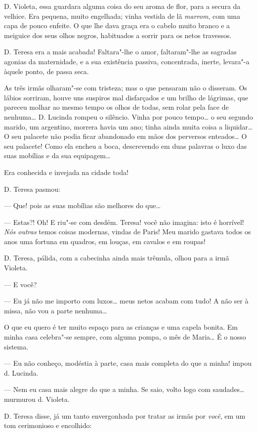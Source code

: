 D. Violeta, essa guardara alguma coisa do seu aroma de flor, para a
secura da velhice. Era pequena, muito engelhada; vinha vestida de lã
\emph{marrom}, com uma capa de pouco enfeite. O que lhe dava graça era o
cabelo muito branco e a meiguice dos seus olhos negros, habituados a
sorrir para os netos travessos.

D. Teresa era a mais acabada! Faltara"-lhe o amor, faltaram"-lhe as
sagradas agonias da maternidade, e a sua existência passiva,
concentrada, inerte, levara"-a àquele ponto, de passa seca.

As três irmãs olharam"-se com tristeza; mas o que pensaram não o
disseram. Os lábios sorriram, houve uns suspiros mal disfarçados e um
brilho de lágrimas, que pareceu molhar ao mesmo tempo os olhos de todas,
sem rolar pela face de nenhuma\ldots{} D. Lucinda rompeu o silêncio. Vinha
por pouco tempo\ldots{} o seu segundo marido, um argentino, morrera havia um
ano; tinha ainda muita coisa a liquidar\ldots{} O seu palacete não podia
ficar abandonado em mãos dos perversos enteados\ldots{} O seu palacete! Como
ela encheu a boca, descrevendo em duas palavras o luxo das suas mobílias
e da sua equipagem\ldots{}

Era conhecida e invejada na cidade toda!

D. Teresa pasmou:

--- Que! pois as suas mobílias são melhores do que\ldots{}

--- Estas?! Oh! E riu"-se com desdém. Teresa! você não imagina: isto é
horrível! \emph{Nós outras} temos coisas modernas, vindas de Paris! Meu
marido gastava todos os anos uma fortuna em quadros, em louças, em
cavalos e em roupas!

D. Teresa, pálida, com a cabecinha ainda mais trêmula, olhou para a irmã
Violeta.

--- E você?

--- Eu já não me importo com luxos\ldots{} meus netos acabam com tudo! A não
ser à missa, não vou a parte nenhuma\ldots{}

O que eu quero é ter muito espaço para as crianças e uma capela bonita.
Em minha casa celebra"-se sempre, com alguma pompa, o mês de Maria\ldots{} É o
nosso sistema.

--- Eu não conheço, modéstia à parte, casa mais completa do que a minha!
impou d. Lucinda.

--- Nem eu casa mais alegre do que a minha. Se saio, volto logo com
saudades\ldots{} murmurou d. Violeta.

D. Teresa disse, já um tanto envergonhada por tratar as irmãs por
\emph{você}, em um tom cerimonioso e encolhido:

